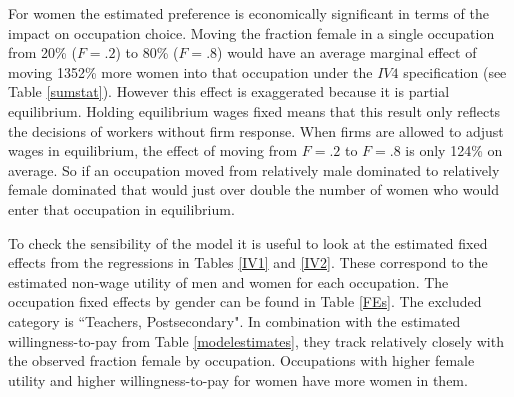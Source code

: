 \documentclass[12pt]{article}
\begin{document}




For women the estimated preference is economically significant in terms of the impact on occupation choice. Moving the fraction female in a single occupation from 20\% ($F=.2$) to 80\% ($F=.8$) would have an average marginal effect of moving 1352\% more women into that occupation under the $IV4$ specification (see Table \ref{sumstat}). However this effect is exaggerated because it is partial equilibrium. Holding equilibrium wages fixed means that this result only reflects the decisions of workers without firm response. When firms are allowed to adjust wages in equilibrium, the effect of moving from $F=.2$ to $F=.8$ is only 124\% on average. So if an occupation moved from relatively male dominated to relatively female dominated that would just over double the number of women who would enter that occupation in equilibrium.



To check the sensibility of the model it is useful to look at the estimated fixed effects from the regressions in Tables \ref{IV1} and \ref{IV2}. These correspond to the estimated non-wage utility of men and women for each occupation. The occupation fixed effects by gender can be found in Table \ref{FEs}. The excluded category is ``Teachers, Postsecondary". In combination with the estimated willingness-to-pay from Table \ref{modelestimates}, they track relatively closely with the observed fraction female by occupation. Occupations with higher female utility and higher willingness-to-pay for women have more women in them. 
\end{document}
